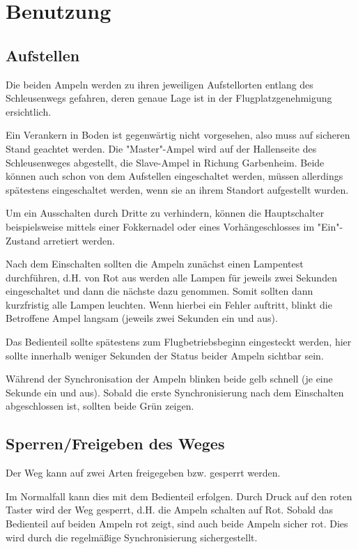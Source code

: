 \documentclass[a4paper, ngerman]{scrartcl}
\begin{document}
\section{Benutzung}
\subsection{Aufstellen}
Die beiden Ampeln werden zu ihren jeweiligen Aufstellorten entlang des Schleusenwegs gefahren, deren genaue Lage ist in der Flugplatzgenehmigung ersichtlich.

Ein Verankern in Boden ist gegenwärtig nicht vorgesehen, also muss auf sicheren Stand geachtet werden. Die "Master"-Ampel wird auf der Hallenseite des Schleusenweges abgestellt, die Slave-Ampel in Richung Garbenheim. Beide können auch schon von dem Aufstellen eingeschaltet werden, müssen allerdings spätestens eingeschaltet werden, wenn sie an ihrem Standort aufgestellt wurden.

Um ein Ausschalten durch Dritte zu verhindern, können die Hauptschalter beispielsweise mittels einer Fokkernadel oder eines Vorhängeschlosses im "Ein"-Zustand arretiert werden.

Nach dem Einschalten sollten die Ampeln zunächst einen Lampentest durchführen, d.H. von Rot aus werden alle Lampen für jeweils zwei Sekunden eingeschaltet und dann die nächste dazu genommen. Somit sollten dann kurzfristig alle Lampen leuchten. Wenn hierbei ein Fehler auftritt, blinkt die Betroffene Ampel langsam (jeweils zwei Sekunden ein und aus).

Das Bedienteil sollte spätestens zum Flugbetriebsbeginn eingesteckt werden, hier sollte innerhalb weniger Sekunden der Status beider Ampeln sichtbar sein.

Während der Synchronisation der Ampeln blinken beide gelb schnell (je eine Sekunde ein und aus). Sobald die erste Synchronisierung nach dem Einschalten abgeschlossen ist, sollten beide Grün zeigen.

\subsection{Sperren/Freigeben des Weges}
Der Weg kann auf zwei Arten freigegeben bzw. gesperrt werden.

Im Normalfall kann dies mit dem Bedienteil erfolgen. Durch Druck auf den roten Taster wird der Weg gesperrt, d.H. die Ampeln schalten auf Rot.  Sobald das Bedienteil auf beiden Ampeln rot zeigt, sind auch beide Ampeln sicher rot. Dies wird durch die regelmäßige Synchronisierung sichergestellt.
\end{document}
